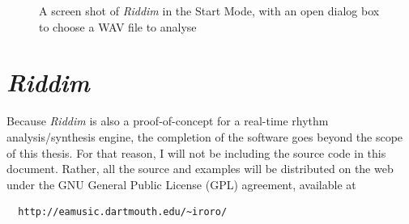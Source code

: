 \begin{figure}[thp]
  \begin{center}
    \caption{A screen shot of {\it Riddim} in the Start Mode, with an
      open dialog box to choose a WAV file to analyse}  
    \label{Riddim Analysis Start Screen Shot}
  \end{center}
\end{figure}




\vspace{7mm}
\section{{\it Riddim}}
\vspace{3mm}

Because {\it Riddim} is also a proof-of-concept for a real-time rhythm
analysis/synthesis engine, the completion of the software goes beyond
the scope of this thesis. For that reason, I will not be including 
the source code in this document. Rather, all the source and examples 
will be distributed on the web under the GNU General Public License
(GPL) agreement, available at \begin{verbatim}
  http://eamusic.dartmouth.edu/~iroro/
\end{verbatim}

